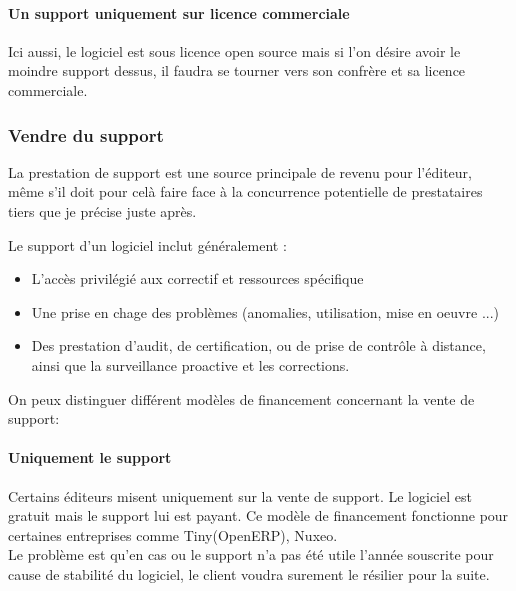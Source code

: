 			\paragraph{Un support uniquement sur licence commerciale\\}

			Ici aussi, le logiciel est sous licence open source mais si l'on désire avoir le moindre support dessus, il faudra se tourner vers son confrère et sa licence commerciale.

			\subsubsection{Vendre du support}

			La prestation de support est une source principale de revenu pour l'éditeur, même s'il doit pour celà faire face à la concurrence potentielle de prestataires tiers que je précise juste après.

			Le support d'un logiciel inclut généralement :

			\begin{itemize}[label=\textbullet, font=\LARGE \color{burntorange}]
				\item L'accès privilégié aux correctif et ressources spécifique
				\item Une prise en chage des problèmes (anomalies, utilisation, mise en oeuvre ...)
				\item Des prestation d'audit, de certification, ou de prise de contrôle à distance, ainsi que la surveillance proactive et les corrections.
			\end{itemize}

			On peux distinguer différent modèles de financement concernant la vente de support:

			\paragraph{Uniquement le support\\}

			Certains éditeurs misent uniquement sur la vente de support. Le logiciel est gratuit mais le support lui est payant. Ce modèle de financement fonctionne pour certaines entreprises comme Tiny(OpenERP), Nuxeo.\\

			Le problème est qu'en cas ou le support n'a pas été utile l'année souscrite pour cause de stabilité du logiciel, le client voudra surement le résilier pour la suite.\\

